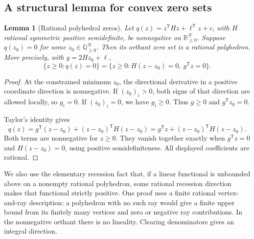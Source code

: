 \documentclass[11pt,letterpaper]{article}
\newtheorem{lemma}[theorem]{Lemma}
\theoremstyle{definition}
\theoremstyle{remark}
\newcommand{\Q}{\mathbb Q}
\newcommand{\R}{\mathbb R}
\begin{document}
\subsection{A structural lemma for convex zero sets}
\begin{lemma}[Rational polyhedral zeros]\label{qoc:mp:lem:convexzeros}
Let $q(z)=z^{\mathsf T}Hz+\ell^{\mathsf T}z+c$, with $H$ rational symmetric
positive semidefinite, be nonnegative on $\R_{\ge0}^{N}$. Suppose
$q(z_0)=0$ for some $z_0\in\Q_{\ge0}^{N}$. Then its orthant zero set is a
rational polyhedron. More precisely, with $g=2Hz_0+\ell$,
\begin{equation}\label{qoc:mp:eq:convexzeros}
 \{z\ge0:q(z)=0\}
 =\{z\ge0:H(z-z_0)=0,\ g^{\mathsf T}z=0\}.
\end{equation}
\end{lemma}
\begin{proof}
At the constrained minimum $z_0$, the directional derivative in a positive
coordinate direction is nonnegative. If $(z_0)_i>0$, both signs of that
direction are allowed locally, so $g_i=0$. If $(z_0)_i=0$, we have $g_i\ge0$.
Thus $g\ge0$ and $g^{\mathsf T}z_0=0$.

Taylor's identity gives
\[
 q(z)=g^{\mathsf T}(z-z_0)+(z-z_0)^{\mathsf T}H(z-z_0)
 =g^{\mathsf T}z+(z-z_0)^{\mathsf T}H(z-z_0).
\]
Both terms are nonnegative for $z\ge0$. They vanish together exactly when
$g^{\mathsf T}z=0$ and $H(z-z_0)=0$, using positive semidefiniteness.
All displayed coefficients are rational.
\end{proof}

We also use the elementary recession fact that, if a linear functional
is unbounded above on a nonempty rational polyhedron, some rational
recession direction makes that functional strictly positive. One proof
uses a finite rational vertex-and-ray description: a polyhedron with no
such ray would give a finite upper bound from its finitely many vertices
and zero or negative ray contributions. In the nonnegative orthant there
is no lineality. Clearing denominators gives an integral direction.
\end{document}
